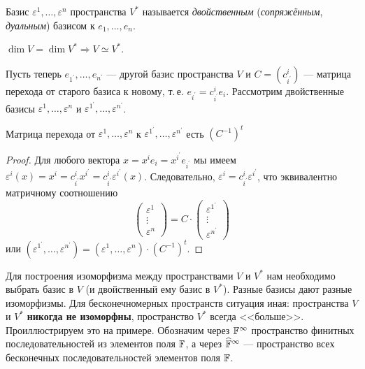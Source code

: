 \begin{definition}
    Базис $\varepsilon^1, \ldots, \varepsilon^n$ пространства $V^\ast$ называется \textit{двойственным} (\textit{сопряжённым}, \textit{дуальным}) базисом к $e_1, \ldots, e_n$.
\end{definition}

\begin{corollary}
    $\dim V = \dim V^\ast \Rightarrow V \simeq V^\ast$.
\end{corollary}

Пусть теперь $e_{1^\prime}, \ldots, e_{n^\prime}$ --- другой базис пространства $V$ и $C = (c^i_{i^\prime})$ --- матрица перехода от старого базиса к новому, т.\,е. $e_{i^\prime} = c^i_{i^\prime}e_i$. Рассмотрим двойственные базисы $\varepsilon^1, \ldots, \varepsilon^n$ и $\varepsilon^{1^\prime}, \ldots, \varepsilon^{n^\prime}$.

\begin{proposal}
    Матрица перехода от $\varepsilon^1, \ldots, \varepsilon^n$ к $\varepsilon^{1^\prime}, \ldots, \varepsilon^{n^\prime}$ есть $(C^{-1})^t$
\end{proposal}

\begin{proof}
    Для любого вектора $x = x^ie_i = x^{i^\prime}e_{i^\prime}$ мы имеем $\varepsilon^i(x) = x^i = c^i_{i^\prime}x^{i^\prime} = c^i_{i^\prime}\varepsilon^{i^\prime}(x)$. Следовательно, $\varepsilon^i = c^i_{i^\prime}\varepsilon^{i^\prime}$, что эквивалентно матричному соотношению
    \[
        \begin{pmatrix}
            \varepsilon^1\\
            \vdots\\
            \varepsilon^n
        \end{pmatrix} = C \cdot
        \begin{pmatrix}
            \varepsilon^{1^\prime}\\
            \vdots\\
            \varepsilon^{n^\prime}
        \end{pmatrix}
    \]
    или $(\varepsilon^{1^\prime}, \ldots, \varepsilon^{n^\prime}) = (\varepsilon^1, \ldots, \varepsilon^n) \cdot (C^{-1})^t$.
\end{proof}

Для построения изоморфизма между пространствами $V$ и $V^\ast$ нам необходимо выбрать базис в $V$ (и двойственный ему базис в $V^\ast$). Разные базисы дают разные изоморфизмы. Для бесконечномерных пространств ситуация иная: пространства $V$ и $V^\ast$ \textbf{никогда не изоморфны}, пространство $V^\ast$ всегда <<больше>>. Проиллюстрируем это на примере. Обозначим через $\mathbb{F}^\infty$ пространство финитных последовательностей из элементов поля $\mathbb{F}$, а через $\widehat{\mathbb{F}}^\infty$ --- пространство всех бесконечных последовательностей элементов поля $\mathbb{F}$.

